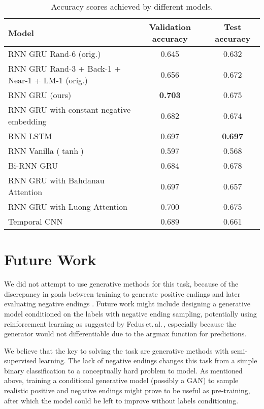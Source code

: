 \documentclass{article}
\begin{document}
\begin{table}[btp]\centering
\begin{tabular}{lcc}
\toprule
Model    	& Validation accuracy  	 		  & Test accuracy  					\\
\midrule
RNN GRU \citep{Roemmele2017AnTest} Rand-6 (orig.)    	& 0.645  	 		  & 0.632  \\
RNN GRU \citep{Roemmele2017AnTest} Rand-3 + Back-1
+ Near-1 + LM-1 (orig.)    	& 0.656  	 		  & 0.672  \\
\midrule

RNN GRU \citep{Roemmele2017AnTest} (ours)    	& \textbf{0.703}  	 		  & 0.675  \\
RNN GRU with constant negative embedding    	& 0.682  	 		  & 0.674 \\
RNN LSTM		& 0.697 		 	  & \textbf{0.697} \\
RNN Vanilla ($\tanh$)		& 0.597 		 	  & 0.568  \\
Bi-RNN GRU		& 0.684   			  & 0.678  \\
RNN GRU with Bahdanau \citep{Bahdanau2016End-to-EndRecognition} Attention     	& 0.697	 	 		  & 0.657  \\
RNN GRU with Luong \citep{Luong2015EffectiveTranslation} Attention    	& 0.700	 	 		  & 0.675  \\
\midrule
Temporal CNN   	& 0.689	 	 		  & 0.661\\\bottomrule
\end{tabular}
\caption{Accuracy scores achieved by different models.}\label{tab:results}
\end{table}

\section{Future Work}\label{sec:futurework}
We did not attempt to use generative methods for this task, because of the discrepancy in goals between training
to generate positive endings and later evaluating negative endings \citep{Wang2017ConditionalComprehension}.
Future work might include designing a generative model conditioned on the labels with negative ending sampling,
potentially using reinforcement learning as suggested by Fedus\,et.\,al.\,\citep{Fedus2018MaskGAN:_______},
especially because the generator would not differentiable due to the $\mathrm{argmax}$ function for predictions.

We believe that the key to solving the task are generative methods with semi-supervised learning.
The lack of negative endings changes this task from a simple binary classification to a conceptually hard problem to model.
As mentioned above, training a conditional generative model (possibly a GAN) to sample realistic positive and negative endings might prove to be useful as pre-training,
after which the model could be left to improve without labels conditioning.
\end{document}
